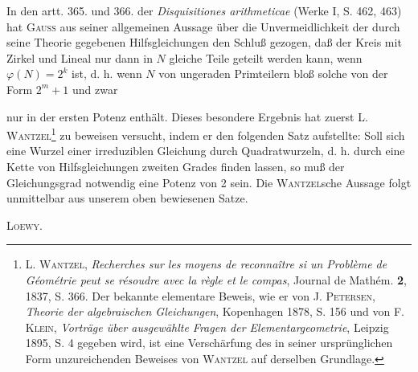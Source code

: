 \par\noindent\hspace*{\parindent}In den artt. 365. und 366. der \textit{Disquisitiones arithmeticae} (Werke I, S. 462, 463) hat \textsc{Gauss} aus seiner allgemeinen Aussage über die Unvermeidlichkeit der durch seine Theorie gegebenen Hilfsgleichungen den Schluß gezogen, daß der Kreis mit Zirkel und Lineal nur dann in \(N\) gleiche Teile geteilt werden kann, wenn \(\varphi(N)=2^k\) ist, d. h. wenn \(N\) von ungeraden Primteilern bloß solche von der Form \(2^m+1\) und zwar
\par\endgroup

\clearpage{}
\par\begingroup\small
\renewcommand{\thefootnote}{*)}
\noindent nur in der ersten Potenz enthält. Dieses besondere Ergebnis hat zuerst \textsc{L. Wantzel}\footnote{\textsc{L. Wantzel}, \textit{Recherches sur les moyens de reconnaître si un Problème de Géométrie peut se résoudre avec la règle et le compas}, Journal de Mathém. \textbf{2}, 1837, S. 366. Der bekannte elementare Beweis, wie er von \textsc{J. Petersen}, \textit{Theorie der algebraischen Gleichungen}, Kopenhagen 1878, S. 156 und von \textsc{F. Klein}, \textit{Vorträge über ausgewählte Fragen der Elementargeometrie}, Leipzig 1895, S. 4 gegeben wird, ist eine Verschärfung des in seiner ursprünglichen Form unzureichenden Beweises von \textsc{Wantzel} auf derselben Grundlage.} zu beweisen versucht, indem er den folgenden Satz aufstellte: Soll sich eine Wurzel einer irreduziblen Gleichung durch Quadratwurzeln, d. h. durch eine Kette von Hilfsgleichungen zweiten Grades finden lassen, so muß der Gleichungsgrad notwendig eine Potenz von 2 sein. Die \textsc{Wantzel}sche Aussage folgt unmittelbar aus unserem oben bewiesenen Satze.
\par\noindent\hfill\textsc{Loewy.}
\par\endgroup
